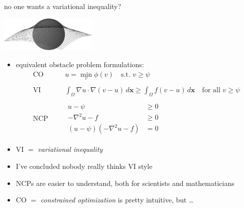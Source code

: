 \documentclass[10pt,hyperref,dvipsnames]{beamer}
\newcommand{\bx}{\mathbf{x}}
\newcommand{\grad}{\nabla}
\begin{document}
\begin{frame}{no one wants a variational inequality?}

\hfill \includegraphics[width=0.35\textwidth]{figs/obstacle65.pdf}

\vspace{-15mm}
\begin{itemize}
\item equivalent obstacle problem formulations:
\begin{align*}
    \text{CO}& &&u = \min_{v} \phi(v) \quad \text{s.t. } v \ge \psi \\
    & \\
    \text{VI}& &&\int_\Omega \grad u \cdot \grad(v-u)\,d\bx \ge \int_\Omega f(v-u)\,d\bx \quad \text{for all } v \ge \psi \\
    & \\
   \text{NCP}& &&\begin{aligned} u - \psi &\ge 0 \\
                                 -\grad^2 u - f &\ge 0 \\
                                 (u - \psi) ( -\grad^2 u - f) &= 0 \end{aligned}
\end{align*}
\item VI $=$ \emph{variational inequality}
\item I've concluded nobody really thinks VI style
\item NCPs are easier to understand, both for scientists and mathematicians
\item CO $=$ \emph{constrained optimization} is pretty intuitive, but \dots
\end{itemize}
\end{frame}
\end{document}
